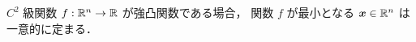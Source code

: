 \begin{theorem}
    $C^2$ 級関数 $f : \mathbb{R}^n \to \mathbb{R}$ が強凸関数である場合，
    関数 $f$ が最小となる $\bm{x} \in \mathbb{R}^n$ は一意的に定まる．
\end{theorem}






